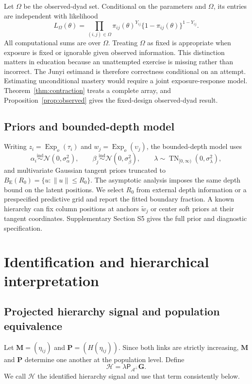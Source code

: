 \documentclass[
  12pt]{article}
\theoremstyle{definition}
\theoremstyle{plain}
\newcommand{\TN}{\operatorname{TN}}
\newcommand{\Normal}{\mathcal N}
\newcommand{\calA}{\mathcal A}
\newcommand{\projA}{\mathsf P_{\calA^\perp}}
\newcommand{\bG}{\mathbf G}
\newcommand{\bP}{\mathbf P}
\newcommand{\bM}{\mathbf M}
\DeclareMathOperator{\Exp}{Exp}
\begin{document}
Let $\Omega$ be the observed-dyad set. Conditional on the parameters and $\Omega$, its entries are independent with likelihood
\[
L_\Omega(\theta)=\prod_{(i,j)\in\Omega}
\pi_{ij}(\theta)^{Y_{ij}}\{1-\pi_{ij}(\theta)\}^{1-Y_{ij}}.
\]
All computational sums are over $\Omega$. Treating $\Omega$ as fixed is appropriate when exposure is fixed or ignorable given observed information. This distinction matters in education because an unattempted exercise is missing rather than incorrect. The Junyi estimand is therefore correctness conditional on an attempt. Estimating unconditional mastery would require a joint exposure-response model. Theorem~\ref{thm:contraction} treats a complete array, and Proposition~\ref{prop:observed} gives the fixed-design observed-dyad result.



\subsection{Priors and bounded-depth model}

Writing $z_i=\Exp_o(\tau_i)$ and $w_j=\Exp_o(\upsilon_j)$, the bounded-depth model uses
\[
\alpha_i\stackrel{\mathrm{ind}}\sim\Normal(0,\sigma_\alpha^2),
\qquad
\beta_j\stackrel{\mathrm{ind}}\sim\Normal(0,\sigma_\beta^2),
\qquad
\lambda\sim\TN_{[0,\infty)}(0,\sigma_\lambda^2),
\]
and multivariate Gaussian tangent priors truncated to $B_{\mathrm E}(R_0)=\{u:\|u\|\le R_0\}$. The asymptotic analysis imposes the same depth bound on the latent positions. We select $R_0$ from external depth information or a prespecified predictive grid and report the fitted boundary fraction. A known hierarchy can fix column positions at anchors $\widetilde w_j$ or center soft priors at their tangent coordinates. Supplementary Section S5 gives the full prior and diagnostic specification.


\section{Identification and hierarchical interpretation}
\label{sec:identification}

\subsection{Projected hierarchy signal and population equivalence}

Let $\bM=(\eta_{ij})$ and $\bP=(H(\eta_{ij}))$. Since both links are strictly increasing, $\bM$ and $\bP$ determine one another at the population level. Define
\[
\mathcal H=\lambda\projA\bG.
\]
We call $\mathcal H$ the {identified hierarchy signal} and use that term consistently below.
\end{document}
